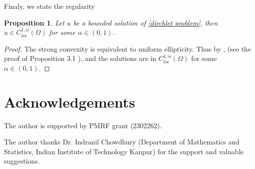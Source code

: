 \documentclass[11pt]{amsart}
\newtheorem{proposition}[theorem]{Proposition}
\numberwithin{equation}{section}
\begin{document}
  Finaly, we state the regularity 
  \begin{proposition}
      Let $u$ be a bounded solution of \eqref{dirchlet problem}, then $u\in C_{loc}^{1,\alpha}(\Omega)$ for some $\alpha\in (0,1)$.
  \end{proposition}
  \begin{proof}
      The strong convexity is equivalent to uniform ellipticity. Thus by \cite[Proposition 3.1]{CozziFarinaValdinoci2016}, \cite[Proposition 3.1]{CozziFarinaValdinoci2014} (see the proof of Proposition 3.1 \cite{CozziFarinaValdinoci2014}), and \cite{Tolksdorf1984} the solutions are in $C_{loc}^{1,\alpha}(\Omega)$ for some $\alpha\in (0,1)$.
  \end{proof}

    \section{Acknowledgements}
    The author is supported by PMRF grant (2302262).

    The author thanks Dr. Indranil Chowdhury (Department of Mathematics and Statistics,
Indian Institute of Technology Kanpur) for the support and valuable suggestions.
\renewcommand\refname{Bibliography}


\end{document}

